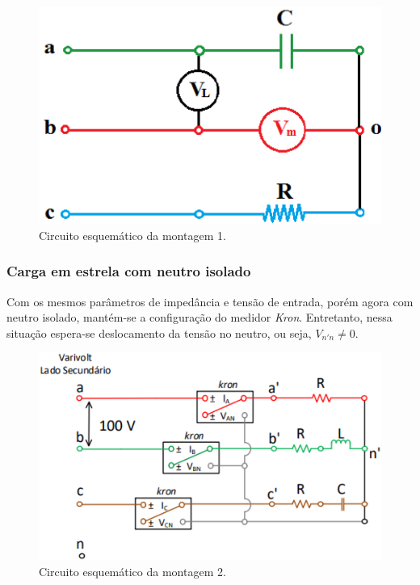 \documentclass[a4paper,12pt,oneside,openany,table,xcdraw]{article}
\begin{document}
\vspace{0.2cm}
\begin{figure}[H]
\centering
\includegraphics[width=13cm]{m1-circuito}
\caption{Circuito esquemático da montagem 1.}
\label{m1:esquema}
\end{figure}

\subsubsection{Carga em estrela com neutro isolado} \label{m2:montagem}
Com os mesmos parâmetros de impedância e tensão de entrada, porém agora com neutro isolado, mantém-se a configuração do medidor \emph{Kron}. Entretanto, nessa situação espera-se deslocamento da tensão no neutro, ou seja, $V_{n'n} \ne 0$.

\vspace{0.1cm}
\begin{figure}[H]
\centering
\includegraphics[width=13cm]{m2-circuito}
\caption{Circuito esquemático da montagem 2.}
\label{m2:esquema}
\end{figure}
\vspace{0.1cm}
\end{document}
